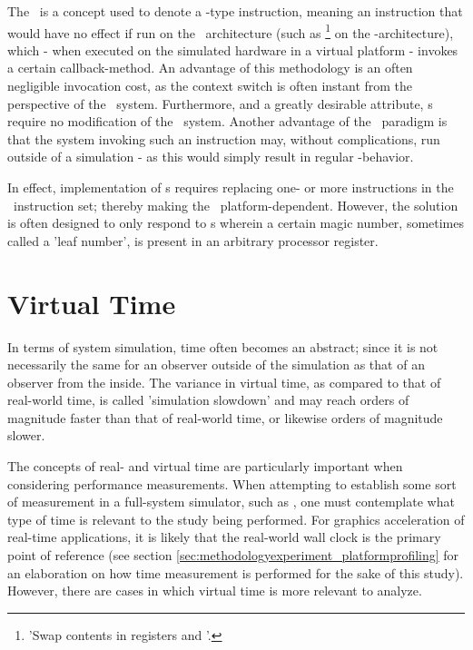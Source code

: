 The \dvttermmagicinstruction\ is a concept used to denote a -type instruction, meaning an instruction that would have no effect if run on the \dvttermtarget\ architecture (such as \footnote{'Swap contents in registers  and '.} on the \dvttermxeightysix -architecture), which - when executed on the simulated hardware in a virtual platform - invokes a certain callback-method.
An advantage of this methodology is an often negligible invocation cost, as the context switch is often instant from the perspective of the \dvttermtarget\ system.
Furthermore, and a greatly desirable attribute, \dvttermmagicinstruction s require no modification of the \dvttermtarget\ system.
Another advantage of the \dvttermmagicinstruction\ paradigm is that the system invoking such an instruction may, without complications, run outside of a simulation - as this would simply result in regular -behavior.

In effect, implementation of \dvttermmagicinstruction s requires replacing one- or more instructions in the \dvttermtarget\ instruction set; thereby making the \dvttermmagicinstruction\ platform-dependent.
However, the solution is often designed to only respond to \dvttermmagicinstruction s wherein a certain magic number, sometimes called a 'leaf number', is present in an arbitrary processor register.

\section{Virtual Time}
\label{sec:background_virtualtime}
In terms of system simulation, time often becomes an abstract; since it is not necessarily the same for an observer outside of the simulation as that of an observer from the inside.
The variance in virtual time, as compared to that of real-world time, is called 'simulation slowdown' and may reach orders of magnitude faster than that of real-world time, or likewise orders of magnitude slower.

The concepts of real- and virtual time are particularly important when considering performance measurements.
When attempting to establish some sort of measurement in a full-system simulator, such as \dvttermsimics , one must contemplate what type of time is relevant to the study being performed.
For graphics acceleration of real-time applications, it is likely that the real-world wall clock is the primary point of reference (see section \ref{sec:methodologyexperiment_platformprofiling} for an elaboration on how time measurement is performed for the sake of this study).
However, there are cases in which virtual time is more relevant to analyze.

